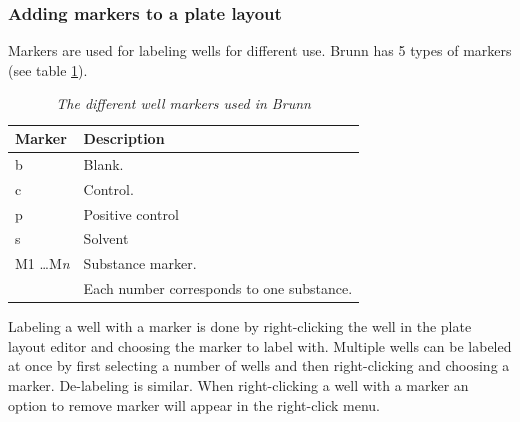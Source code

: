 \documentclass[a4paper,10pt]{article}
\begin{document}
            \subsubsection{Adding markers to a plate layout}
                Markers are used for labeling wells for different use. Brunn
                has 5 types of markers (see table \ref{markersTable}).

                \begin{table}
                    \begin{center}
                        \begin{tabular}{l|l}
                            Marker & Description \\
                            \hline
                            b & Blank.           \\
                            c & Control.         \\
                            p & Positive control \\
                            s & Solvent          \\
                            M1 \ldots M\textit{n} & Substance marker. \\ 
                                                  & Each number corresponds to
                                                    one substance. \\
                        \end{tabular}
                    \end{center}
                    \caption{\textit{The different well markers used in Brunn}}
                    \label{markersTable}
                \end{table}
                
                Labeling a well with a marker is done by right-clicking the
                well in the plate layout editor and choosing the marker to
                label with. Multiple wells can be labeled at once by first
                selecting a number of wells and then right-clicking and
                choosing a marker. De-labeling is similar. When right-clicking a
                well with a marker an option to remove marker will appear in the
                right-click menu.
\end{document}
